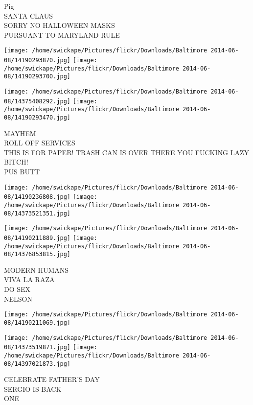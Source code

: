 \documentclass[10pt,letterpaper]{article}
\begin{document}
Pig\\
SANTA CLAUS\\
SORRY NO HALLOWEEN MASKS\\
PURSUANT TO MARYLAND RULE\\
\pagebreak

\texttt{[image: /home/swickape/Pictures/flickr/Downloads/Baltimore 2014-06-08/14190293870.jpg]}
\texttt{[image: /home/swickape/Pictures/flickr/Downloads/Baltimore 2014-06-08/14190293700.jpg]}

\texttt{[image: /home/swickape/Pictures/flickr/Downloads/Baltimore 2014-06-08/14375408292.jpg]}
\texttt{[image: /home/swickape/Pictures/flickr/Downloads/Baltimore 2014-06-08/14190293470.jpg]}

MAYHEM\\
ROLL OFF SERVICES\\
THIS IS FOR PAPER!  TRASH CAN IS OVER THERE YOU FUCKING LAZY BITCH!\\
PUS BUTT\\
\pagebreak

\texttt{[image: /home/swickape/Pictures/flickr/Downloads/Baltimore 2014-06-08/14190236808.jpg]}
\texttt{[image: /home/swickape/Pictures/flickr/Downloads/Baltimore 2014-06-08/14373521351.jpg]}

\texttt{[image: /home/swickape/Pictures/flickr/Downloads/Baltimore 2014-06-08/14190211889.jpg]}
\texttt{[image: /home/swickape/Pictures/flickr/Downloads/Baltimore 2014-06-08/14376853815.jpg]}

MODERN HUMANS\\
VIVA LA RAZA\\
DO SEX\\
NELSON\\
\pagebreak

\texttt{[image: /home/swickape/Pictures/flickr/Downloads/Baltimore 2014-06-08/14190211069.jpg]}

\vspace{0.25in}
\texttt{[image: /home/swickape/Pictures/flickr/Downloads/Baltimore 2014-06-08/14373519871.jpg]}
\texttt{[image: /home/swickape/Pictures/flickr/Downloads/Baltimore 2014-06-08/14397021873.jpg]}

CELEBRATE FATHER'S DAY\\
SERGIO IS BACK\\
ONE\\
\pagebreak
\end{document}
